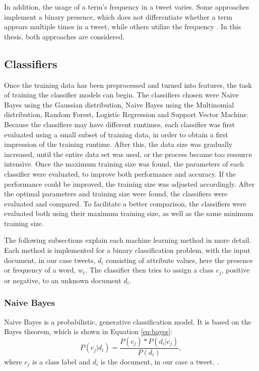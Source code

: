 In addition, the usage of a term's frequency in a tweet varies. Some approaches implement a binary presence, which does not differentiate whether a term appears multiple times in a tweet, while others utilize the frequency \cite{DBLP:journals/csur/GiachanouC16}. In this thesis, both approaches are considered.

\subsection{Classifiers}
\label{sub:classifiers}

Once the training data has been preprocessed and turned into features, the task of training the classifier models can begin. The classifiers chosen were Naive Bayes using the Gaussian distribution, Naive Bayes using the Multinomial distribution, Random Forest, Logistic Regression and Support Vector Machine. Because the classifiers may have different runtimes, each classifier was first evaluated using a small subset of training data, in order to obtain a first impression of the training runtime. After this, the data size was gradually increased, until the entire data set was used, or the process became too resource intensive. Once the maximum training size was found, the parameters of each classifier were evaluated, to improve both performance and accuracy. If the performance could be improved, the training size was adjusted accordingly. After the optimal parameters and training size were found, the classifiers were evaluated and compared. To facilitate a better comparison, the classifiers were evaluated both using their maximum training size, as well as the same minimum training size.

The following subsections explain each machine learning method in more detail. Each method is implemented for a binary classification problem, with the input document, in our case tweets, $d_i$ consisting of attribute values, here the presence or frequency of a word, $w_t$. The classifier then tries to assign a class $c_j$, positive or negative, to an unknown document $d_i$.

    \subsubsection{Naive Bayes}
        Naive Bayes is a probabilistic, generative classification model. It is based on the Bayes theorem, which is shown in Equation \eqref{eq:bayes}:
        \begin{equation}
            \label{eq:bayes}
            P(c_j|d_i) = \frac{P(c_j) * P(d_i|c_j)}{P(d_i)},
        \end{equation}
        where $c_j$ is a class label and $d_i$ is the document, in our case a tweet. \cite{DBLP:books/aw/TanSKK2019}. 
        
